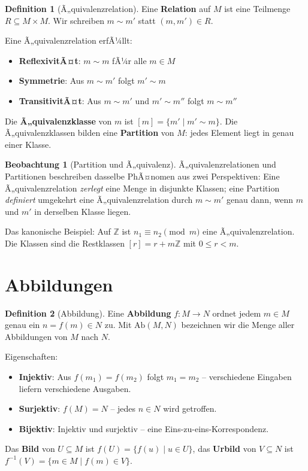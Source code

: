 ﻿\documentclass[a4paper,12pt]{report}
\theoremstyle{definition}
\newtheorem{definition}{Definition}
\newtheorem{beobachtung}{Beobachtung}
\begin{document}
\begin{definition}[Ã„quivalenzrelation]
    Eine \textbf{Relation} auf $M$ ist eine Teilmenge $R \subseteq M \times M$.
    Wir schreiben $m \sim m'$ statt $(m, m') \in R$.

    Eine Ã„quivalenzrelation erfÃ¼llt:
    \begin{itemize}
        \item[-] \textbf{ReflexivitÃ¤t}: $m \sim m$ fÃ¼r alle $m \in M$
        \item[-] \textbf{Symmetrie}: Aus $m \sim m'$ folgt $m' \sim m$
        \item[-] \textbf{TransitivitÃ¤t}: Aus $m \sim m'$ und $m' \sim m''$ folgt $m \sim m''$
    \end{itemize}

    Die \textbf{Ã„quivalenzklasse} von $m$ ist $[m] = \{m' \mid m' \sim m\}$.
    Die Ã„quivalenzklassen bilden eine \textbf{Partition} von $M$: jedes Element
    liegt in genau einer Klasse.
\end{definition}

\begin{beobachtung}[Partition und Ã„quivalenz]
    Ã„quivalenzrelationen und Partitionen beschreiben dasselbe PhÃ¤nomen aus
    zwei Perspektiven: Eine Ã„quivalenzrelation \emph{zerlegt} eine Menge in
    disjunkte Klassen; eine Partition \emph{definiert} umgekehrt eine
    Ã„quivalenzrelation durch $m \sim m'$ genau dann, wenn $m$ und $m'$ in
    derselben Klasse liegen.

    Das kanonische Beispiel: Auf $\mathbb{Z}$ ist $n_1 \equiv n_2 \pmod{m}$
    eine Ã„quivalenzrelation. Die Klassen sind die Restklassen
    $[r] = r + m\mathbb{Z}$ mit $0 \le r < m$.
\end{beobachtung}

\section{Abbildungen}

\begin{definition}[Abbildung]
    Eine \textbf{Abbildung} $f : M \to N$ ordnet jedem $m \in M$ genau ein
    $n = f(m) \in N$ zu. Mit $\mathrm{Ab}(M, N)$ bezeichnen wir die Menge aller
    Abbildungen von $M$ nach $N$.

    Eigenschaften:
    \begin{itemize}
        \item[-] \textbf{Injektiv}: Aus $f(m_1) = f(m_2)$ folgt $m_1 = m_2$ --
              verschiedene Eingaben liefern verschiedene Ausgaben.
        \item[-] \textbf{Surjektiv}: $f(M) = N$ -- jedes $n \in N$ wird getroffen.
        \item[-] \textbf{Bijektiv}: Injektiv und surjektiv -- eine
              Eins-zu-eins-Korrespondenz.
    \end{itemize}
    Das \textbf{Bild} von $U \subseteq M$ ist $f(U) = \{f(u) \mid u \in U\}$,
    das \textbf{Urbild} von $V \subseteq N$ ist
    $f^{-1}(V) = \{m \in M \mid f(m) \in V\}$.
\end{definition}
\end{document}

